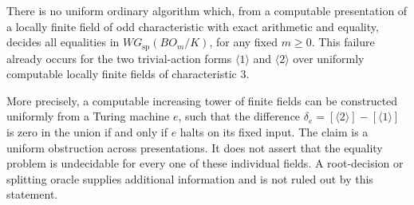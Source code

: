 \begin{theorem}
\label{C:locally-finite-equality-obstruction}
There is no uniform ordinary algorithm which, from a computable
presentation of a locally finite field of odd characteristic
with exact arithmetic and equality, decides all equalities in
$WG_{\mathrm{sp}}(BO_m/K)$, for any fixed $m\geq0$.
This failure already occurs for the two trivial-action forms
$\langle1\rangle$ and $\langle2\rangle$ over uniformly computable
locally finite fields of characteristic $3$.

More precisely, a computable increasing tower of finite fields
can be constructed uniformly from a Turing machine $e$, such
that the difference
$\delta_e=[\langle2\rangle]-[\langle1\rangle]$ is zero in the
union if and only if $e$ halts on its fixed input. The claim is
a uniform obstruction across presentations. It does not assert
that the equality problem is undecidable for every one of these
individual fields. A root-decision or splitting oracle supplies
additional information and is not ruled out by this statement.
\end{theorem}
